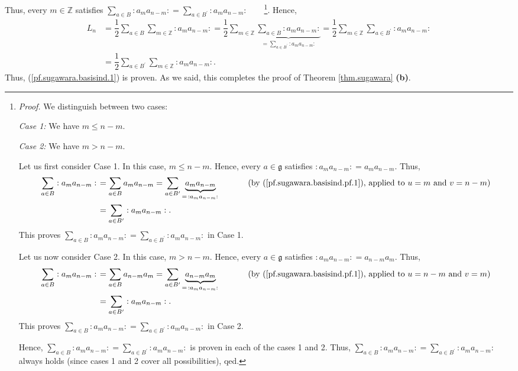 \documentclass[etingof-lie.tex]{subfiles}
\begin{document}
Thus, every $m\in\mathbb{Z}$ satisfies $\sum\limits_{a\in B}\left.
:a_{m}a_{n-m}:\right.  =\sum\limits_{a\in B^{\prime}}\left.  :a_{m}%
a_{n-m}:\right.  $\ \ \ \ \footnote{\textit{Proof.} We distinguish between two
cases:
\par
\textit{Case 1:} We have $m\leq n-m$.
\par
\textit{Case 2:} We have $m>n-m$.
\par
Let us first consider Case 1. In this case, $m\leq n-m$. Hence, every
$a\in\mathfrak{g}$ satisfies $\left.  :a_{m}a_{n-m}:\right.  =a_{m}a_{n-m}$.
Thus,
\begin{align*}
\sum\limits_{a\in B}\left.  :a_{m}a_{n-m}:\right.   &  =\sum\limits_{a\in
B}a_{m}a_{n-m}=\sum\limits_{a\in B^{\prime}}\underbrace{a_{m}a_{n-m}%
}_{=\left.  :a_{m}a_{n-m}:\right.  }\ \ \ \ \ \ \ \ \ \ \left(  \text{by
(\ref{pf.sugawara.basisind.pf.1}), applied to }u=m\text{ and }v=n-m\right) \\
&  =\sum\limits_{a\in B^{\prime}}\left.  :a_{m}a_{n-m}:\right.  .
\end{align*}
This proves $\sum\limits_{a\in B}\left.  :a_{m}a_{n-m}:\right.  =\sum
\limits_{a\in B^{\prime}}\left.  :a_{m}a_{n-m}:\right.  $ in Case 1.
\par
Let us now consider Case 2. In this case, $m>n-m$. Hence, every $a\in
\mathfrak{g}$ satisfies $\left.  :a_{m}a_{n-m}:\right.  =a_{n-m}a_{m}$. Thus,
\begin{align*}
\sum\limits_{a\in B}\left.  :a_{m}a_{n-m}:\right.   &  =\sum\limits_{a\in
B}a_{n-m}a_{m}=\sum\limits_{a\in B^{\prime}}\underbrace{a_{n-m}a_{m}%
}_{=\left.  :a_{m}a_{n-m}:\right.  }\ \ \ \ \ \ \ \ \ \ \left(  \text{by
(\ref{pf.sugawara.basisind.pf.1}), applied to }u=n-m\text{ and }v=m\right) \\
&  =\sum\limits_{a\in B^{\prime}}\left.  :a_{m}a_{n-m}:\right.  .
\end{align*}
This proves $\sum\limits_{a\in B}\left.  :a_{m}a_{n-m}:\right.  =\sum
\limits_{a\in B^{\prime}}\left.  :a_{m}a_{n-m}:\right.  $ in Case 2.
\par
Hence, $\sum\limits_{a\in B}\left.  :a_{m}a_{n-m}:\right.  =\sum\limits_{a\in
B^{\prime}}\left.  :a_{m}a_{n-m}:\right.  $ is proven in each of the cases 1
and 2. Thus, $\sum\limits_{a\in B}\left.  :a_{m}a_{n-m}:\right.
=\sum\limits_{a\in B^{\prime}}\left.  :a_{m}a_{n-m}:\right.  $ always holds
(since cases 1 and 2 cover all possibilities), qed.}. Hence,%
\begin{align*}
L_{n}  &  =\dfrac{1}{2}\sum\limits_{a\in B}\sum\limits_{m\in\mathbb{Z}}\left.
:a_{m}a_{n-m}:\right.  =\dfrac{1}{2}\sum\limits_{m\in\mathbb{Z}}%
\underbrace{\sum\limits_{a\in B}\left.  :a_{m}a_{n-m}:\right.  }%
_{=\sum\limits_{a\in B^{\prime}}\left.  :a_{m}a_{n-m}:\right.  }=\dfrac{1}%
{2}\sum\limits_{m\in\mathbb{Z}}\sum\limits_{a\in B^{\prime}}\left.
:a_{m}a_{n-m}:\right. \\
&  =\dfrac{1}{2}\sum\limits_{a\in B^{\prime}}\sum\limits_{m\in\mathbb{Z}%
}\left.  :a_{m}a_{n-m}:\right.  .
\end{align*}
Thus, (\ref{pf.sugawara.basisind.1}) is proven. As we said, this completes the
proof of Theorem \ref{thm.sugawara} \textbf{(b)}.
\end{document}
